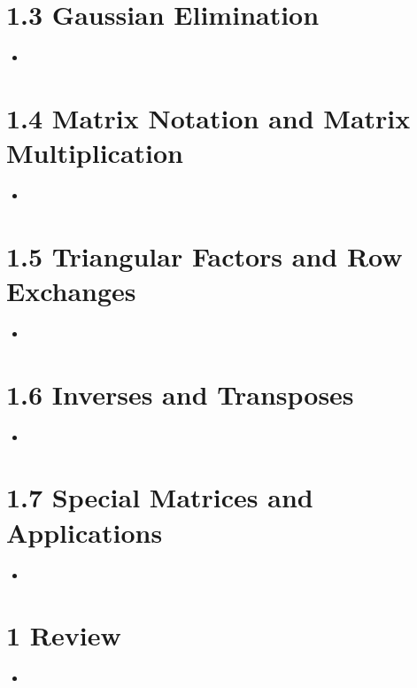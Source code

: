 \section{1.3 Gaussian Elimination}
\begin{itemize}
  \item []

\end{itemize}

\section{1.4 Matrix Notation and Matrix Multiplication}
\begin{itemize}
  \item []

\end{itemize}

\section{1.5 Triangular Factors and Row Exchanges}
\begin{itemize}
  \item []

\end{itemize}

\section{1.6 Inverses and Transposes}
\begin{itemize}
  \item []

\end{itemize}

\section{1.7 Special Matrices and Applications}
\begin{itemize}
  \item []


\end{itemize}

\section{1 Review}
\begin{itemize}
  \item []


\end{itemize}


